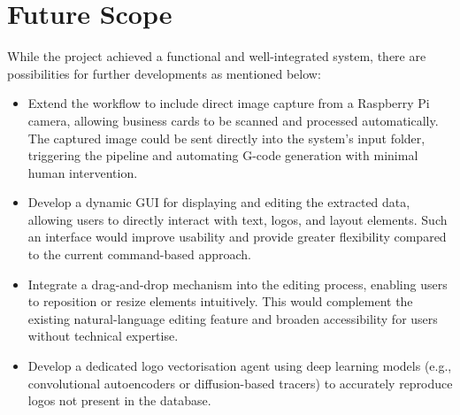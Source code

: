 \chapter{Future Scope}

While the project achieved a functional and well-integrated system, there are possibilities for further developments as mentioned below:

\begin{itemize}
	\item Extend the workflow to include direct image capture from a Raspberry Pi camera, allowing business cards to be scanned and processed automatically. The captured image could be sent directly into the system’s input folder, triggering the pipeline and automating G-code generation with minimal human intervention.
	\item Develop a dynamic GUI for displaying and editing the extracted data, allowing users to directly interact with text, logos, and layout elements. Such an interface would improve usability and provide greater flexibility compared to the current command-based approach.
	\item Integrate a drag-and-drop mechanism into the editing process, enabling users to reposition or resize elements intuitively. This would complement the existing natural-language editing feature and broaden accessibility for users without technical expertise.
	\item Develop a dedicated logo vectorisation agent using deep learning models (e.g., convolutional autoencoders or diffusion-based tracers) to accurately reproduce logos not present in the database.
	
\end{itemize}